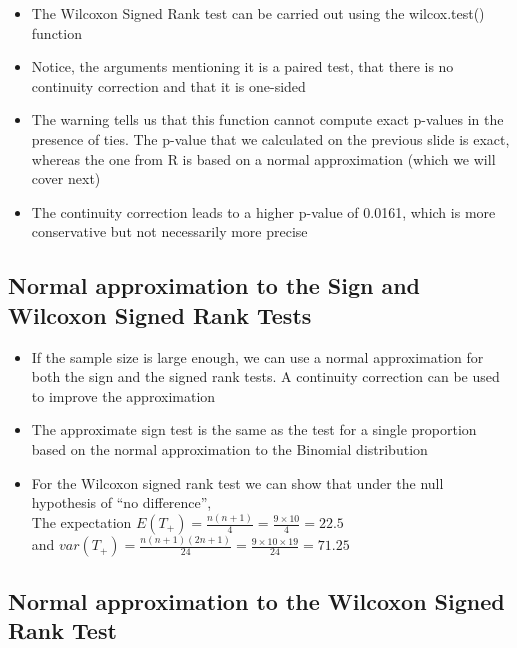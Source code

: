 \documentclass[
]{book}
\providecommand{\tightlist}{%
  \setlength{\itemsep}{0pt}\setlength{\parskip}{0pt}}
\begin{document}
\begin{itemize}
\tightlist
\item
  The Wilcoxon Signed Rank test can be carried out using the wilcox.test() function
\item
  Notice, the arguments mentioning it is a paired test, that there is no continuity correction and that it is one-sided
\item
  The warning tells us that this function cannot compute exact p-values in the presence of ties. The p-value that we calculated on the previous slide is exact, whereas the one from R is based on a normal approximation (which we will cover next)
\item
  The continuity correction leads to a higher p-value of 0.0161, which is more conservative but not necessarily more precise
\end{itemize}

\hypertarget{normal-approximation-to-the-sign-and-wilcoxon-signed-rank-tests}{%
\subsection{Normal approximation to the Sign and Wilcoxon Signed Rank Tests}\label{normal-approximation-to-the-sign-and-wilcoxon-signed-rank-tests}}

\begin{itemize}
\tightlist
\item
  If the sample size is large enough, we can use a normal approximation for both the sign and the signed rank tests. A continuity correction can be used to improve the approximation
\item
  The approximate sign test is the same as the test for a single proportion based on the normal approximation to the Binomial distribution
\item
  For the Wilcoxon signed rank test we can show that under the null hypothesis of ``no difference'',\\
  The expectation \(E(T_+)=\frac{n(n+1)}{4}=\frac{9\times 10}{4}=22.5\)\\
  and \(var(T_+)=\frac{n(n+1)(2n+1)}{24}=\frac{9\times 10\times 19}{24}=71.25\)
\end{itemize}

\hypertarget{normal-approximation-to-the-wilcoxon-signed-rank-test}{%
\subsection{Normal approximation to the Wilcoxon Signed Rank Test}\label{normal-approximation-to-the-wilcoxon-signed-rank-test}}
\end{document}
